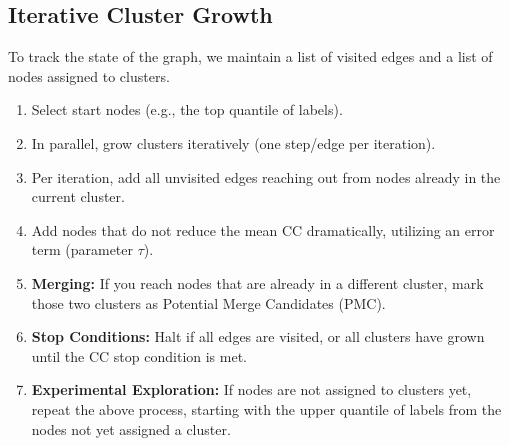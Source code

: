 \subsection{Iterative Cluster Growth}
To track the state of the graph, we maintain a list of visited edges and a list of nodes assigned to clusters.

\begin{enumerate}
    \item Select start nodes (e.g., the top quantile of labels).
    \item In parallel, grow clusters iteratively (one step/edge per iteration).
    \item Per iteration, add all unvisited edges reaching out from nodes already in the current cluster.
    \item Add nodes that do not reduce the mean CC dramatically, utilizing an error term (parameter $\tau$).
    \item \textbf{Merging:} If you reach nodes that are already in a different cluster, mark those two clusters as Potential Merge Candidates (PMC).
    \item \textbf{Stop Conditions:} Halt if all edges are visited, or all clusters have grown until the CC stop condition is met.
    \item \textbf{Experimental Exploration:} If nodes are not assigned to clusters yet, repeat the above process, starting with the upper quantile of labels from the nodes not yet assigned a cluster.
\end{enumerate}